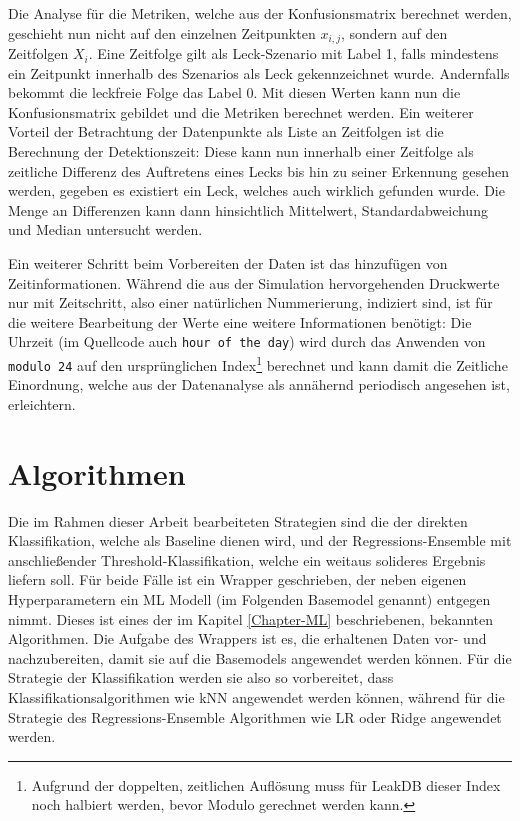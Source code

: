 Die Analyse für die Metriken, welche aus der
 Konfusionsmatrix berechnet werden, geschieht nun nicht auf den einzelnen Zeitpunkten $x_{i, j}$, sondern auf
 den Zeitfolgen $X_i$. Eine Zeitfolge gilt als Leck-Szenario mit Label 1, falls mindestens ein Zeitpunkt
 innerhalb des Szenarios als Leck gekennzeichnet wurde. Andernfalls bekommt die leckfreie Folge das Label 0.
 Mit diesen Werten kann nun die Konfusionsmatrix gebildet und die Metriken berechnet werden. Ein weiterer Vorteil
 der Betrachtung der Datenpunkte als Liste an Zeitfolgen ist die Berechnung der Detektionszeit: Diese kann nun
 innerhalb einer Zeitfolge als zeitliche Differenz des Auftretens eines Lecks bis hin zu seiner Erkennung gesehen
 werden, gegeben es existiert ein Leck, welches auch wirklich gefunden wurde. Die Menge an Differenzen kann dann
 hinsichtlich Mittelwert, Standardabweichung und Median untersucht werden.

Ein weiterer Schritt beim Vorbereiten der Daten ist das hinzufügen von Zeitinformationen. Während die aus der
 Simulation hervorgehenden Druckwerte nur mit Zeitschritt, also einer natürlichen Nummerierung, indiziert sind,
 ist für die weitere Bearbeitung der Werte eine weitere Informationen benötigt: Die Uhrzeit (im Quellcode auch
 \texttt{hour of the day}) wird durch das Anwenden von \texttt{modulo 24} auf den ursprünglichen
 Index\footnote{Aufgrund der doppelten, zeitlichen Auflösung muss für LeakDB dieser Index noch halbiert werden,
 bevor Modulo gerechnet werden kann.} berechnet und kann damit die Zeitliche Einordnung, welche aus der
 Datenanalyse als annähernd periodisch angesehen ist, erleichtern.


\section{Algorithmen}

Die im Rahmen dieser Arbeit bearbeiteten Strategien sind die der direkten Klassifikation, welche als Baseline
 dienen wird, und der Regressions-Ensemble mit anschließender Threshold-Klassifikation, welche ein weitaus
 solideres Ergebnis liefern soll. Für beide Fälle ist ein Wrapper geschrieben, der neben eigenen Hyperparametern
 ein ML Modell (im Folgenden Basemodel genannt) entgegen nimmt. Dieses ist eines der im Kapitel \ref{Chapter-ML}
 beschriebenen, bekannten Algorithmen. Die Aufgabe des Wrappers ist es, die erhaltenen Daten vor- und
 nachzubereiten, damit sie auf die Basemodels angewendet werden können. Für die Strategie der Klassifikation
 werden sie also so vorbereitet, dass Klassifikationsalgorithmen wie kNN angewendet werden können, während für
 die Strategie des Regressions-Ensemble Algorithmen wie LR oder Ridge angewendet werden.

